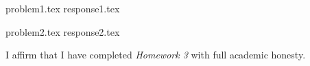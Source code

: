 \documentclass[letterpaper, 12pt]{article}
\begin{document}

% 
{problem1.tex}
{response1.tex}

% 
{problem2.tex}
{response2.tex}




\par

I affirm that I have completed \textit{Homework 3} with full academic honesty.
\end{document}
